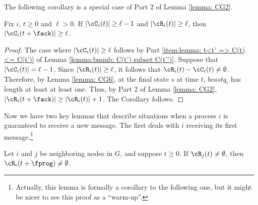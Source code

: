 The following corollary is a special case of Part 2 of Lemma \ref{lemma:  CG2}.



\begin{corollary}
\label{lemma:bmmb: ack and prog progress}
\label{coro:bmmb: ack and prog progress}
Fix $i$, $t\geq 0$ and $\ell>0$.
If $|\cC_i(t)| \geq \ell-1$ and $|\cR_i(t)| \geq \ell$, then $|\cC_i(t+\fack)| \geq \ell$.
\end{corollary}
\begin{proof}
The case where $|\cC_i(t)|\geq \ell$ follows
by Part \ref{item:lemma: t<t' => C(t) <= C(t')}
of Lemma \ref{lemma:bmmb: C(t') subset C(t'')}.
Suppose that $|\cC_i(t)| = \ell-1$.
Since $|\cR_i(t)| \geq \ell$, it follows that $\cR_i(t)-\cC_i(t)\not=\emptyset$.
Therefore,
by
Lemma \ref{lemma: CG6},
at the final state $s$ at time $t$, $bcastq_i$ has length at least at least one.
Thus, by Part 2 of Lemma \ref{lemma:  CG2}, $|\cR_i(t+\fack)| \geq |\cR_i(t)|+1$.
The Corollary follows.
\end{proof}




Now we have two key lemmas that describe situations when a process $i$
is guaranteed to receive a new message.
The first deals with $i$ receiving its first message.\footnote{
  Actually, this lemma is formally a corollary to the following one,
  but it might be nicer to see this proof as a ``warm-up''.
  }


\begin{lemma}
\label{lemma: CG5}
Let $i$ and $j$ be neighboring nodes in $G$, and suppose $t \geq 0$.
If $\cR_j(t) \neq \emptyset$, then $\cR_i(t + \fprog) \neq \emptyset$.
\end{lemma}

